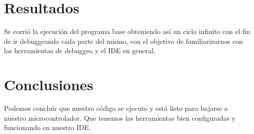 \documentclass{article}
\begin{document}
\section{Resultados}
Se corrió la ejecución del programa base obteniendo así un ciclo infinito con el fin de ir debuggeando cada parte del mismo, con el objetivo de familiarizarnos con las herramientas de debuggeo y el IDE en general.



\section{Conclusiones}
Podemos concluir que nuestro código se ejecuto y está listo para bajarse a nuestro microcontrolador. Que tenemos las herramientas bien configuradas y funcionando en nuestro IDE.

\end{document}

